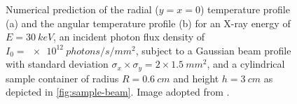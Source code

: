 \documentclass[
twoside,
openright,
titlepage,
numbers=noenddot,
headinclude,
fleqn,
a4paper,
footinclude=true,
cleardoublepage=empty,
abstractoff,
BCOR=5mm,
paper=a4,
fontsize=11pt,
british,ngerman,american,
]{scrreprt}
\begin{document}
\begin{figure}
  \centering
  \caption[Numerical prediction of the temperature profile within the
  sample environment due to X-ray-induced heat load.]{%
    Numerical prediction of the radial ($y=x=0$) temperature profile
    (a) and the angular temperature profile (b) for an X-ray energy of
    $E=\SI{30}{keV}$, an incident photon flux density of
    $I_0=\SI{e12}{photons/s/mm^2}$, subject to a Gaussian beam profile
    with standard deviation $\sigma_x \times \sigma_y = 2\times 1.5
    \SI{}{mm^2}$, and a cylindrical sample container of radius
    $R=\SI{0.6}{cm}$ and height $h=\SI{3}{cm}$ as depicted in
    \cref{fig:sample-beam}.  Image adopted from
    \cite{Moosmann2013nature}.}
  \label{fig:temp-sim}
\end{figure}
\end{document}
